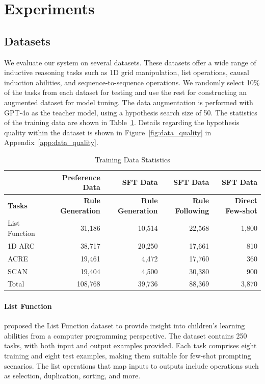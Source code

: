 \section{Experiments}
\label{sec:experiment}
\subsection{Datasets}
We evaluate our system on several datasets. These datasets offer a wide range of inductive reasoning tasks such as 1D grid manipulation, list operations, causal induction abilities, and sequence-to-sequence operations. We randomly select 10\% of the tasks from each dataset for testing and use the rest for constructing an augmented dataset for model tuning. The data augmentation is performed with GPT-4o as the teacher model, using a hypothesis search size of 50. The statistics of the training data are shown in Table~\ref{tab:dataset_summary}. Details regarding the hypothesis quality within the dataset is shown in Figure~\ref{fig:data_quality} in Appendix~\ref{app:data_quality}.

\begin{table}
\small
\centering
\begin{tabular}{@{}lrrrr@{}}
\toprule
\textbf{} & \textbf{Preference Data} & \textbf{SFT Data} & \textbf{SFT Data} & \textbf{SFT Data} \\ \midrule
\textbf{Tasks} & \textbf{Rule Generation} & \textbf{Rule Generation} & \textbf{Rule Following} & \textbf{Direct Few-shot} \\ \midrule
List Function & 31,186 & 10,514 & 22,568 & 1,800 \\
1D ARC & 38,717 & 20,250 & 17,661 & 810 \\
ACRE & 19,461 & 4,472 & 17,760 & 360 \\ 
SCAN & 19,404 & 4,500 & 30,380 & 900 \\ \midrule
Total & 108,768 & 39,736 & 88,369 & 3,870 \\ \bottomrule
\end{tabular}
\caption{Training Data Statistics}
\label{tab:dataset_summary}
\vspace{-1em}
\end{table}

\paragraph{List Function} \citet{rule2020child} proposed the List Function dataset to provide insight into children's learning abilities from a computer programming perspective. The dataset contains 250 tasks, with both input and output examples provided. Each task comprises eight training and eight test examples, making them suitable for few-shot prompting scenarios. The list operations that map inputs to outputs include operations such as selection, duplication, sorting, and more.

